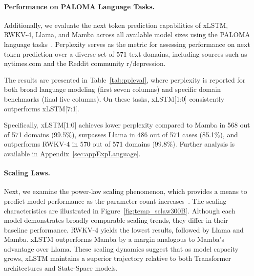 \paragraph{Performance on PALOMA Language Tasks.} Additionally, we evaluate the next token prediction capabilities of xLSTM, RWKV-4, Llama, and Mamba across all available model sizes using the PALOMA language tasks~\citep{Magnusson:23arxivshort}. Perplexity serves as the metric for assessing performance on next token prediction over a diverse set of 571 text domains, including sources such as nytimes.com and the Reddit community r/depression.

The results are presented in Table~\ref{tab:ppleval}, where perplexity is reported for both broad language modeling (first seven columns) and specific domain benchmarks (final five columns). On these tasks, xLSTM[1:0] consistently outperforms xLSTM[7:1].

Specifically, xLSTM[1:0] achieves lower perplexity compared to Mamba in 568 out of 571 domains (99.5\%), surpasses Llama in 486 out of 571 cases (85.1\%), and outperforms RWKV-4 in 570 out of 571 domains (99.8\%). Further analysis is available in Appendix~\ref{sec:appExpLanguage}.

\paragraph{Scaling Laws.} Next, we examine the power-law scaling phenomenon, which provides a means to predict model performance as the parameter count increases~\citep{Kaplan:20,Brown:20short}. 
The scaling characteristics are illustrated in Figure~\ref{fig:temp_sclaw300B}. Although each model demonstrates broadly comparable scaling trends, they differ in their baseline performance. RWKV-4 yields the lowest results, followed by Llama and Mamba. xLSTM outperforms Mamba by a margin analogous to Mamba's advantage over Llama. These scaling dynamics suggest that as model capacity grows, xLSTM maintains a superior trajectory relative to both Transformer architectures and State-Space models.

